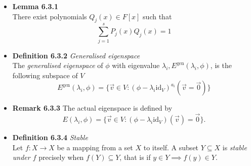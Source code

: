 \documentclass[11pt,a4paper]{article}
\begin{document}
\begin{itemize}
    \item \textbf{Lemma 6.3.1} \\
        There exist polynomials $Q_j(x) \in F[x]$ such that
        \[
            \sum_{j=1}^s P_j(x) Q_j(x) = 1
        \]

    \item \textbf{Definition 6.3.2} \emph{Generalised eigenspace} \\
        The \emph{generalised eigenspace} of $\phi$ with eigenvalue
        $\lambda_i, E^{\mathrm{gen}}(\lambda_i, \phi)$, is the following subspace of $V$
        \[
            E^{\mathrm{gen}} (\lambda_i, \phi) =
            \{\vec{v} \in V : {(\phi - \lambda_i \mathrm{id}_V)}^{a_i} (\vec{v} = \vec{0}) \}
        \]

    \item \textbf{Remark 6.3.3}
        The actual eigenspace is defined by
        \[
            E(\lambda_i, \phi) = \{ \vec{v} \in V : (\phi - \lambda_i \mathrm{id}_V)
            (\vec{v}) = \vec{0} \}.
        \]

    \item \textbf{Definition 6.3.4} \emph{Stable} \\
        Let $f : X \to X$ be a mapping from a set $X$ to itself.
        A subset $Y \subseteq X$ is \emph{stable under $f$} precisely when
        $f(Y) \subseteq Y$, that is if $y \in Y \implies f(y) \in Y$.


\end{itemize}
\end{document}
